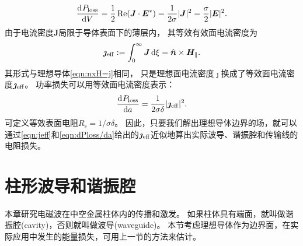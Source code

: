 \[
    \frac{\mathop{}\!\mathrm{d}^{}P_{\mathrm{loss}}}{\mathrm{d}{V}^{}} = \frac12\operatorname{Re}(\bm J \cdot \bm E^\ast) = \frac1{2\sigma}\lvert\bm J\rvert^2 = \frac\sigma2\lvert\bm E\rvert^2.
\]
由于电流密度$\bm J$局限于导体表面下的薄层内，
其等效有效面电流密度为
\begin{equation}
    \label{eqn:jeff}
    \bm\jmath_{\mathrm{eff}} := \int_0^\infty\bm J\mathop{}\!\mathrm{d}\xi = \mathop{}\!\hat{\bm{n}} \times \bm H_\parallel.
\end{equation}
其形式与理想导体\eqref{eqn:nxH=j}相同，
只是理想面电流密度$\bm\jmath$换成了等效面电流密度$\bm\jmath_{\mathrm{eff}}$。
功率损失可以用等效面电流密度表示：
\begin{equation}
    \label{eqn:dPloss/da}
    \frac{\mathop{}\!\mathrm{d}^{}P_{\mathrm{loss}}}{\mathrm{d}{a}^{}} = \frac1{2\sigma\delta}\lvert\bm\jmath_{\mathrm{eff}}\rvert^2.
\end{equation}
可定义等效表面电阻$R_{\mathrm{s}} = 1/\sigma\delta$。
因此，只要我们解出理想导体边界的场，就可以通过\eqref{eqn:jeff}和\eqref{eqn:dPloss/da}给出的$\bm\jmath_{\mathrm{eff}}$近似地算出实际波导、谐振腔和传输线的电阻损失。

\section{柱形波导和谐振腔}

本章研究电磁波在中空金属柱体内的传播和激发。
如果柱体具有端面，就叫做谐振腔(cavity)，否则就叫做波导(waveguide)。
本节考虑理想导体作为边界面，在实际应用中发生的能量损失，可用上一节的方法来估计。

